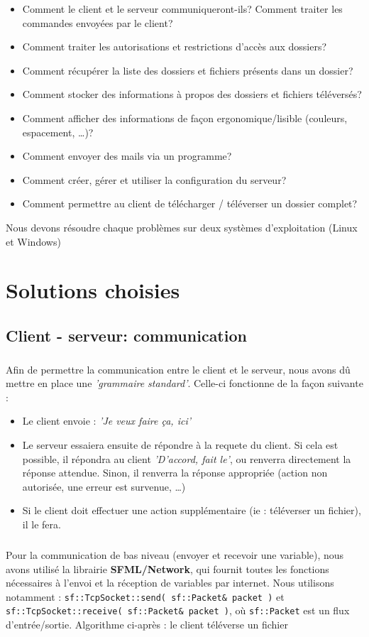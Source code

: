 \documentclass[12pt,a4paper,twoside]{article}
\begin{document}
			\begin{itemize}
				\item{} Comment le client et le serveur communiqueront-ils? Comment traiter les commandes envoyées par le client?
				\item{} Comment traiter les autorisations et restrictions d'accès aux dossiers?
				\item{} Comment récupérer la liste des dossiers et fichiers présents dans un dossier?
				\item{} Comment stocker des informations à propos des dossiers et fichiers téléversés?
				\item{} Comment afficher des informations de façon ergonomique/lisible (couleurs, espacement, \ldots{})?
				\item{} Comment envoyer des mails via un programme?
				\item{} Comment créer, gérer et utiliser la configuration du serveur?
				\item{} Comment permettre au client de télécharger / téléverser un dossier complet?
			\end{itemize}
			Nous devons résoudre chaque problèmes sur deux systèmes d'exploitation (Linux et Windows)
	\section{Solutions choisies} %
		\subsection{Client - serveur: communication} %
			\subparagraph*{}
				Afin de permettre la communication entre le client et le serveur, nous avons dû mettre en place une \textit{'grammaire standard'}. Celle-ci fonctionne de la façon suivante :
				\begin{itemize}
					\item{} Le client envoie : \textit{'Je veux faire ça, ici'}
					\item{} Le serveur essaiera ensuite de répondre à la requete du client. Si cela est possible, il répondra au client \textit{'D'accord, fait le'}, ou renverra directement la réponse attendue. Sinon, il renverra la réponse appropriée (action non autorisée, une erreur est survenue, \ldots{})
					\item{} Si le client doit effectuer une action supplémentaire (ie : téléverser un fichier), il le fera.
				\end{itemize}
			\subparagraph*{}
				Pour la communication de bas niveau (envoyer et recevoir une variable), nous avons utilisé la librairie \textbf{SFML/Network}, qui fournit toutes les fonctions nécessaires à l'envoi et la réception de variables par internet. Nous utilisons notamment : \lstinline$sf::TcpSocket::send( sf::Packet& packet )$ et \lstinline$sf::TcpSocket::receive( sf::Packet& packet )$, où \lstinline$sf::Packet$ est un flux d'entrée/sortie.
				Algorithme ci-après : le client téléverse un fichier
\end{document}
